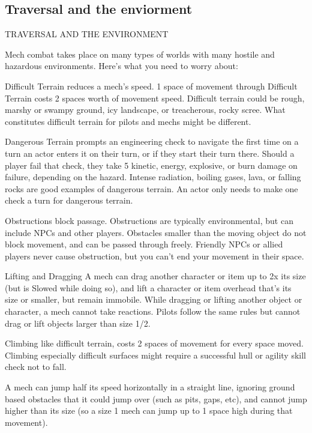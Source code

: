 \subsection{Traversal and the enviorment}
                          TRAVERSAL AND THE ENVIRONMENT

Mech combat takes place on many types of worlds with many hostile and hazardous
environments. Here’s what you need to worry about:





Difficult Terrain reduces a mech’s speed. 1 space of movement through Difficult Terrain costs 2
spaces worth of movement speed. Difficult terrain could be rough, marshy or swampy ground,
icy landscape, or treacherous, rocky scree. What constitutes difficult terrain for pilots and mechs
might be different.


Dangerous Terrain prompts an engineering check to navigate the first time on a turn an actor
enters it on their turn, or if they start their turn there. Should a player fail that check, they take 5
kinetic, energy, explosive, or burn damage on failure, depending on the hazard. Intense radiation,
boiling gases, lava, or falling rocks are good examples of dangerous terrain. An actor only needs
to make one check a turn for dangerous terrain.


Obstructions block passage. Obstructions are typically environmental, but can include NPCs
and other players. Obstacles smaller than the moving object do not block movement, and
can be passed through freely. Friendly NPCs or allied players never cause obstruction, but
you can’t end your movement in their space.


Lifting and  Dragging
A mech can drag another character or item up to 2x its size (but is Slowed while doing so), and
lift a character or item overhead that’s its size or smaller, but remain immobile. While dragging or
lifting another object or character, a mech cannot take reactions. Pilots follow the same rules but
cannot drag or lift objects larger than size 1/2.


Climbing like difficult terrain, costs 2 spaces of movement for every space moved. Climbing
especially difficult surfaces might require a successful hull or agility skill check not to fall.


A mech can jump half its speed horizontally in a straight line, ignoring ground based obstacles
that it could jump over (such as pits, gaps, etc), and cannot jump higher than its size (so a size 1
mech can jump up to 1 space high during that movement).



